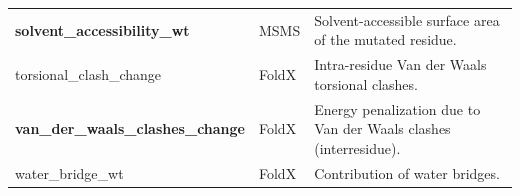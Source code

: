 \begin{table}[tb]
\begin{tabular}{ l | l | p{7cm} }
		\textbf{solvent\_accessibility\_wt}       & MSMS           & Solvent-accessible surface area of the mutated residue.                                             \\
		torsional\_clash\_change                  & FoldX          & Intra-residue Van der Waals torsional clashes.                                                      \\
		\textbf{van\_der\_waals\_clashes\_change} & FoldX          & Energy penalization due to Van der Waals clashes (interresidue).                                    \\
		water\_bridge\_wt                         & FoldX          & Contribution of water bridges.                                                                      \\
		\bottomrule
	\end{tabular}
\end{table}

